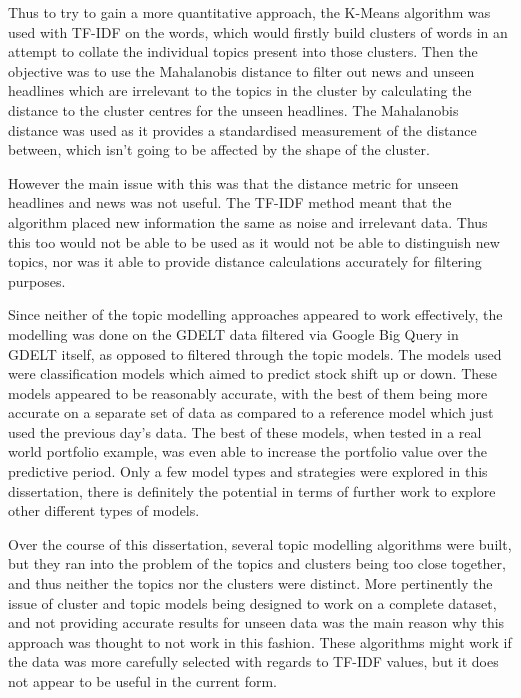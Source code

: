 Thus to try to gain a more quantitative approach, the K-Means algorithm was used with TF-IDF on the words, which would firstly build clusters of words in an attempt to collate the individual topics present into those clusters. Then the objective was to use the Mahalanobis distance to filter out news and unseen headlines which are irrelevant to the topics in the cluster by calculating the distance to the cluster centres for the unseen headlines. The Mahalanobis distance was used as it provides a standardised measurement of the distance between, which isn't going to be affected by the shape of the cluster. 

However the main issue with this was that the distance metric for unseen headlines and news was not useful. The TF-IDF method meant that the algorithm placed new information the same as noise and irrelevant data. Thus this too would not be able to be used as it would not be able to distinguish new topics, nor was it able to provide distance calculations accurately for filtering purposes. 

Since neither of the topic modelling approaches appeared to work effectively, the modelling was done on the GDELT data filtered via Google Big Query in GDELT itself, as opposed to filtered through the topic models. The models used were classification models which aimed to predict stock shift up or down. These models appeared to be reasonably accurate, with the best of them being more accurate on a separate set of data as compared to a reference model which just used the previous day's data. The best of these models, when tested in a real world portfolio example, was even able to increase the portfolio value over the predictive period. Only a few model types and strategies were explored in this dissertation, there is definitely the potential in terms of further work to explore other different types of models.

Over the course of this dissertation, several topic modelling algorithms were built, but they ran into the problem of the topics and clusters being too close together, and thus neither the topics nor the clusters were distinct. More pertinently the issue of cluster and topic models being designed to work on a complete dataset, and not providing accurate results for unseen data was the main reason why this approach was thought to not work in this fashion. These algorithms might work if the data was more carefully selected with regards to TF-IDF values, but it does not appear to be useful in the current form. 

